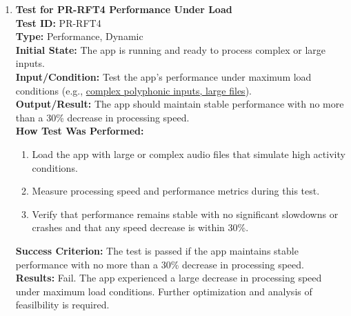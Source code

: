 \documentclass[12pt, titlepage]{article}
\begin{document}
\begin{enumerate}
      \item \textbf{Test for PR-RFT4 Performance Under Load} \\
      \newline
      \textbf{Test ID:} PR-RFT4 \\
      \textbf{Type:} Performance, Dynamic \\
      \textbf{Initial State:} The app is running and ready to process complex or large inputs. \\
      \textbf{Input/Condition:} Test the app’s performance under maximum load conditions (e.g., 
      \href{https://github.com/emilyperica/ScoreGen/tree/main/test/TestingDatasets/piano-samples/sample-chords}{complex polyphonic inputs, large files}). \\
      \textbf{Output/Result:} The app should maintain stable performance with no more than a 30\% decrease in processing speed. \\
      \textbf{How Test Was Performed:}
      \begin{enumerate}
          \item Load the app with large or complex audio files that simulate high activity conditions.
          \item Measure processing speed and performance metrics during this test.
          \item Verify that performance remains stable with no significant slowdowns or crashes and that any speed decrease 
          is within 30\%.
      \end{enumerate}
      \textbf{Success Criterion:} The test is passed if the app maintains stable performance with no more than a 30\% decrease in processing speed.\\
      \textbf{Results:} Fail. The app experienced a large decrease in processing speed under maximum load conditions. Further optimization and analysis of feasilbility is required.\\


\end{enumerate}
\end{document}
